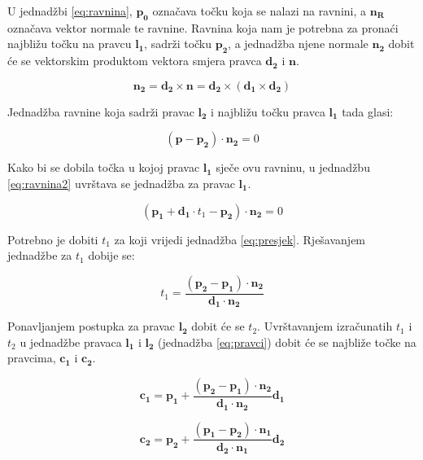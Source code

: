 \documentclass[times, utf8, diplomski]{fer}
\begin{document}
U jednadžbi \ref{eq:ravnina}, $\bm{p_0}$ označava točku koja se nalazi na ravnini, a $\bm{n_R}$ označava vektor normale te ravnine. Ravnina koja nam je potrebna za pronaći najbližu točku na pravcu $\bm{l_1}$, sadrži točku $\bm{p_2}$, a jednadžba njene normale $\bm{n_2}$ dobit će se vektorskim produktom vektora smjera pravca $\bm{d_2}$ i $\bm{n}$.

\begin{equation}
\bm{n_2} = \bm{d_2} \times \bm{n} = \bm{d_2} \times (\bm{d_1} \times \bm{d_2})
\end{equation}

Jednadžba ravnine koja sadrži pravac $\bm{l_2}$ i najbližu točku pravca $\bm{l_1}$ tada glasi:

\begin{equation}
(\bm{p} - \bm{p_2})\cdot \bm{n_2} = 0
\label{eq:ravnina2}
\end{equation}

Kako bi se dobila točka u kojoj pravac $\bm{l_1}$ sječe ovu ravninu, u jednadžbu \ref{eq:ravnina2} uvrštava se jednadžba za pravac $\bm{l_1}$.

\begin{equation}
(\bm{p_1} + \bm{d_1}\cdot t_1 - \bm{p_2})\cdot \bm{n_2} = 0
\label{eq:presjek}
\end{equation}

Potrebno je dobiti $t_1$ za koji vrijedi jednadžba \ref{eq:presjek}. Rješavanjem jednadžbe za $t_1$ dobije se:

\begin{equation}
t_1 = \frac{(\bm{p_2} - \bm{p_1})\cdot \bm{n_2}}{\bm{d_1}\cdot\bm{n_2}}
\end{equation}

\vspace{5mm}

Ponavljanjem postupka za pravac $\bm{l_2}$ dobit će se $t_2$. Uvrštavanjem izračunatih $t_1$ i $t_2$ u jednadžbe pravaca $\bm{l_1}$ i $\bm{l_2}$ (jednadžba \ref{eq:pravci}) dobit će se najbliže točke na pravcima, $\bm{c_1}$ i $\bm{c_2}$.

\begin{equation}
\bm{c_1} = \bm{p_1} + \frac{(\bm{p_2} - \bm{p_1})\cdot \bm{n_2}}{\bm{d_1}\cdot\bm{n_2}}\bm{d_1}
\end{equation}

\begin{equation}
\bm{c_2} = \bm{p_2} + \frac{(\bm{p_1} - \bm{p_2})\cdot \bm{n_1}}{\bm{d_2}\cdot\bm{n_1}}\bm{d_2}
\end{equation}
\end{document}
